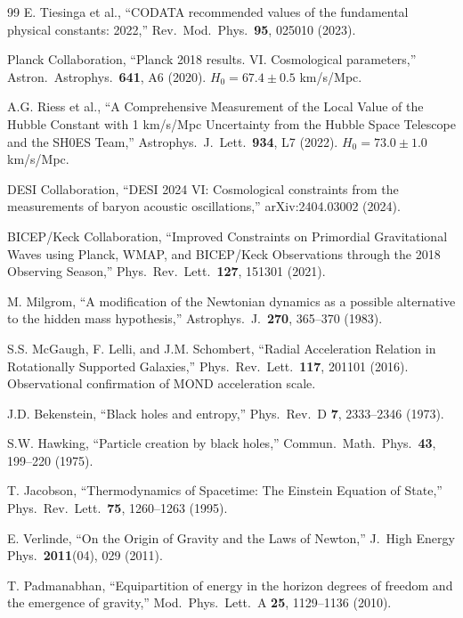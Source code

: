 \documentclass[11pt,a4paper]{article}
\theoremstyle{plain}
\theoremstyle{definition}
\theoremstyle{remark}
\begin{document}
\begin{thebibliography}{99}
 E. Tiesinga et al., ``CODATA recommended values of the fundamental physical constants: 2022,'' Rev.\ Mod.\ Phys.\ \textbf{95}, 025010 (2023).

 Planck Collaboration, ``Planck 2018 results. VI. Cosmological parameters,'' Astron.\ Astrophys.\ \textbf{641}, A6 (2020). $H_0 = 67.4 \pm 0.5$ km/s/Mpc.

 A.G. Riess et al., ``A Comprehensive Measurement of the Local Value of the Hubble Constant with 1 km/s/Mpc Uncertainty from the Hubble Space Telescope and the SH0ES Team,'' Astrophys.\ J.\ Lett.\ \textbf{934}, L7 (2022). $H_0 = 73.0 \pm 1.0$ km/s/Mpc.

 DESI Collaboration, ``DESI 2024 VI: Cosmological constraints from the measurements of baryon acoustic oscillations,'' arXiv:2404.03002 (2024).

 BICEP/Keck Collaboration, ``Improved Constraints on Primordial Gravitational Waves using Planck, WMAP, and BICEP/Keck Observations through the 2018 Observing Season,'' Phys.\ Rev.\ Lett.\ \textbf{127}, 151301 (2021).

 M. Milgrom, ``A modification of the Newtonian dynamics as a possible alternative to the hidden mass hypothesis,'' Astrophys.\ J.\ \textbf{270}, 365--370 (1983).

 S.S. McGaugh, F. Lelli, and J.M. Schombert, ``Radial Acceleration Relation in Rotationally Supported Galaxies,'' Phys.\ Rev.\ Lett.\ \textbf{117}, 201101 (2016). Observational confirmation of MOND acceleration scale.

 J.D. Bekenstein, ``Black holes and entropy,'' Phys.\ Rev.\ D \textbf{7}, 2333--2346 (1973).

 S.W. Hawking, ``Particle creation by black holes,'' Commun.\ Math.\ Phys.\ \textbf{43}, 199--220 (1975).

 T. Jacobson, ``Thermodynamics of Spacetime: The Einstein Equation of State,'' Phys.\ Rev.\ Lett.\ \textbf{75}, 1260--1263 (1995).

 E. Verlinde, ``On the Origin of Gravity and the Laws of Newton,'' J.\ High Energy Phys.\ \textbf{2011}(04), 029 (2011).

 T. Padmanabhan, ``Equipartition of energy in the horizon degrees of freedom and the emergence of gravity,'' Mod.\ Phys.\ Lett.\ A \textbf{25}, 1129--1136 (2010).


\end{thebibliography}
\end{document}
